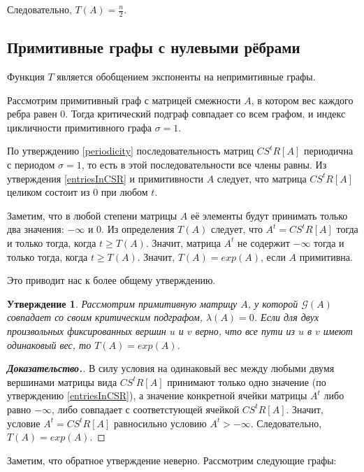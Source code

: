 \documentclass[12pt]{article}
\newtheorem{proposition}[theorem]{Утверждение}
\begin{document}
Следовательно, $T(A) = \frac{n}{2}$.

\subsection{Примитивные графы с нулевыми рёбрами}
Функция $T$ является обобщением экспоненты на непримитивные графы.

Рассмотрим примитивный граф с матрицей смежности $A$, в котором вес каждого ребра равен $0$. Тогда критический подграф совпадает со всем графом, и индекс цикличности примитивного графа $\sigma = 1$.

По утверждению \ref{periodicity} последовательность матриц $CS^tR[A]$ периодична с периодом $\sigma = 1$, то есть в этой последовательности все члены равны. Из утверждения \ref{entriesInCSR} и примитивности $A$ следует, что матрица $CS^tR[A]$ целиком состоит из $0$ при любом $t$.

Заметим, что в любой степени матрицы $A$ её элементы будут принимать только два значения: $-\infty$ и $0$. Из определения $T(A)$ следует, что $A^t = CS^tR[A]$ тогда и только тогда, когда $t \ge T(A)$. Значит, матрица $A^t$ не содержит $-\infty$ тогда и только тогда, когда $t \ge T(A)$. Значит, $T(A) = exp(A)$, если $A$ примитивна.

Это приводит нас к более общему утверждению.

\begin{proposition} \label{onePathProposition}
Рассмотрим примитивную матрицу $A$, у которой $\mathcal{G}(A)$ совпадает со своим критическим подграфом, $\lambda(A) = 0$. Если для двух произвольных фиксированных вершин $u$ и $v$ верно, что все пути из $u$ в $v$ имеют одинаковый вес, то $T(A) = exp(A)$.
\end{proposition}
\begin{proof}[\textbf{Доказательство.}]
В силу условия на одинаковый вес между любыми двумя вершинами матрицы вида $CS^tR[A]$ принимают только одно значение (по утверждению \ref{entriesInCSR}), а значение конкретной ячейки матрицы $A^t$ либо равно $-\infty$, либо совпадает с соответстующей ячейкой $CS^tR[A]$. Значит, условие $A^t = CS^tR[A]$ равносильно условию $A^t > -\infty$. Следовательно, $T(A) = exp(A)$.
\end{proof}

Заметим, что обратное утверждение неверно. Рассмотрим следующие графы:
\end{document}
